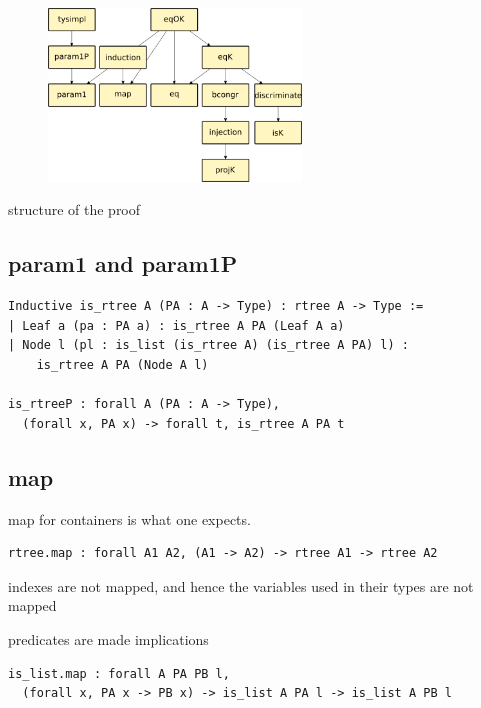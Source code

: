 \documentclass[sigplan,10pt,review]{acmart}\settopmatter{printfolios=true,printccs=false,printacmref=false}
\begin{document}
\begin{figure}
\includegraphics[width=0.6\textwidth]{derive.png}
\end{figure}

structure of the proof



\subsection{param1 and param1P} %


\begin{lstlisting}
Inductive is_rtree A (PA : A -> Type) : rtree A -> Type :=
| Leaf a (pa : PA a) : is_rtree A PA (Leaf A a)
| Node l (pl : is_list (is_rtree A) (is_rtree A PA) l) :
    is_rtree A PA (Node A l)
	   
is_rtreeP : forall A (PA : A -> Type),
  (forall x, PA x) -> forall t, is_rtree A PA t
\end{lstlisting}


\subsection{map} %

map for containers is what one expects.

\begin{lstlisting}
rtree.map : forall A1 A2, (A1 -> A2) -> rtree A1 -> rtree A2
\end{lstlisting}

indexes are not mapped, and hence the variables
used in their types are not mapped

predicates are made implications


\begin{lstlisting}
is_list.map : forall A PA PB l,
  (forall x, PA x -> PB x) -> is_list A PA l -> is_list A PB l
\end{lstlisting}
\end{document}
